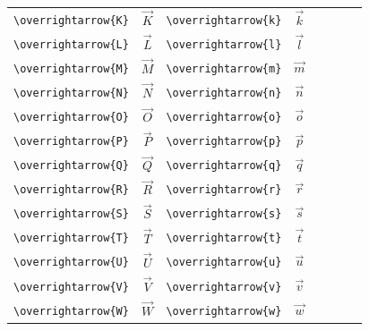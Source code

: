 \documentclass[12pt,a4paper]{article}
\begin{document}
\begin{longtable}{|l|c|l|c|c|l|c|c|}
\verb|\overrightarrow{K}| & $\overrightarrow{K}$ & \verb|\overrightarrow{k}| & $\overrightarrow{k}$ &                &                           &                      & \\
\verb|\overrightarrow{L}| & $\overrightarrow{L}$ & \verb|\overrightarrow{l}| & $\overrightarrow{l}$ &                &                           &                      & \\
\verb|\overrightarrow{M}| & $\overrightarrow{M}$ & \verb|\overrightarrow{m}| & $\overrightarrow{m}$ &                &                           &                      & \\
\verb|\overrightarrow{N}| & $\overrightarrow{N}$ & \verb|\overrightarrow{n}| & $\overrightarrow{n}$ &                &                           &                      & \\
\verb|\overrightarrow{O}| & $\overrightarrow{O}$ & \verb|\overrightarrow{o}| & $\overrightarrow{o}$ &                &                           &                      & \\
\verb|\overrightarrow{P}| & $\overrightarrow{P}$ & \verb|\overrightarrow{p}| & $\overrightarrow{p}$ &                &                           &                      & \\
\verb|\overrightarrow{Q}| & $\overrightarrow{Q}$ & \verb|\overrightarrow{q}| & $\overrightarrow{q}$ &                &                           &                      & \\
\verb|\overrightarrow{R}| & $\overrightarrow{R}$ & \verb|\overrightarrow{r}| & $\overrightarrow{r}$ &                &                           &                      & \\
\verb|\overrightarrow{S}| & $\overrightarrow{S}$ & \verb|\overrightarrow{s}| & $\overrightarrow{s}$ &                &                           &                      & \\
\verb|\overrightarrow{T}| & $\overrightarrow{T}$ & \verb|\overrightarrow{t}| & $\overrightarrow{t}$ &                &                           &                      & \\
\verb|\overrightarrow{U}| & $\overrightarrow{U}$ & \verb|\overrightarrow{u}| & $\overrightarrow{u}$ &                &                           &                      & \\
\verb|\overrightarrow{V}| & $\overrightarrow{V}$ & \verb|\overrightarrow{v}| & $\overrightarrow{v}$ &                &                           &                      & \\
\verb|\overrightarrow{W}| & $\overrightarrow{W}$ & \verb|\overrightarrow{w}| & $\overrightarrow{w}$ &                &                           &                      & \\

\end{longtable}
\end{document}
